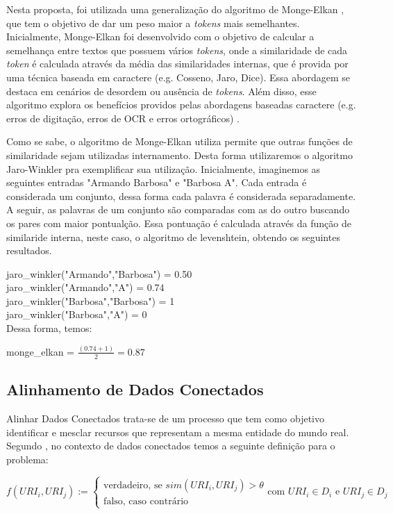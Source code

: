Nesta proposta, foi utilizada uma generalização do algoritmo de Monge-Elkan \cite{monge1996field}, que tem o objetivo de dar um peso maior a \textit{tokens} mais semelhantes. Inicialmente, Monge-Elkan foi desenvolvido com o objetivo de calcular a semelhança entre textos que possuem vários \textit{tokens}, onde a similaridade de cada \textit{token} é calculada através da média das similaridades internas, que é provida por uma técnica baseada em caractere (e.g. Cosseno, Jaro, Dice). Essa abordagem se destaca em cenários de desordem ou ausência de \textit{tokens}. Além disso, esse algoritmo explora os benefícios providos pelas abordagens baseadas caractere (e.g. erros de digitação, erros de OCR e erros ortográficos) \cite{jimenez2009generalized}.

Como se sabe, o algoritmo de Monge-Elkan utiliza permite que outras funções de similaridade sejam utilizadas internamento. Desta forma utilizaremos o algoritmo Jaro-Winkler pra exemplificar sua utilização. Inicialmente, imaginemos as seguintes entradas "Armando Barbosa" e "Barbosa A". Cada entrada é considerada um conjunto, dessa forma cada palavra é considerada separadamente. A seguir, as palavras de um conjunto são comparadas com as do outro buscando os pares com maior pontualção. Essa pontuação é calculada através da função de similaride interna, neste caso, o algoritmo de levenshtein, obtendo os seguintes resultados.

\noindent
jaro\_winkler("Armando","Barbosa") = 0.50\\
jaro\_winkler("Armando","A") = 0.74\\
jaro\_winkler("Barbosa","Barbosa") = 1\\
jaro\_winkler("Barbosa","A") = 0\\

Dessa forma, temos:

\noindent
monge\_elkan = $\frac{(0.74+1)}{2} = 0.87$

\subsection{Alinhamento de Dados Conectados}

Alinhar Dados Conectados  trata-se de um processo que tem como objetivo identificar e mesclar recursos que representam a mesma entidade do mundo real. Segundo , no contexto de dados conectados temos a seguinte definição para o problema:

\begin{equation}
f\left( { URI }_{ i },{ URI }_{ j } \right) :=\begin{cases} \mbox{verdadeiro, se } sim\left( { URI }_{ i },{ URI }_{ j } \right) >\theta  \\ \mbox{falso, caso contrário} \end{cases}\mbox{com }{ URI }_{ i } \in { D }_{ i }\mbox{ e }{ URI }_{ j } \in { D }_{ j }
\end{equation}

